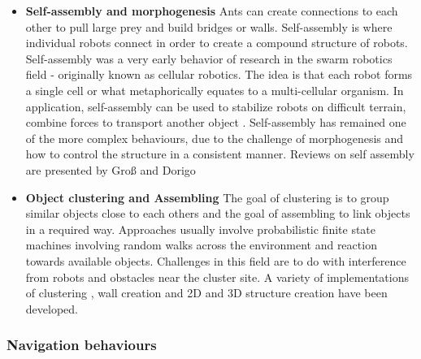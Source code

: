 \begin{itemize}
	\item \textbf{Self-assembly and morphogenesis}
	Ants can create connections to each other to pull large prey and build bridges or walls. Self-assembly is where individual robots connect in order to create a compound structure of robots. Self-assembly was a very early behavior of research in the swarm robotics field - originally known as cellular robotics. The idea is that each robot forms a single cell or what metaphorically equates to a multi-cellular organism. In application, self-assembly can be used to stabilize robots on difficult terrain, combine forces to transport another object \cite{brambilla2013swarm}. Self-assembly has remained one of the more complex behaviours, due to the challenge of morphogenesis and how to control the structure in a consistent manner.  
Reviews on self assembly are presented by Groß and Dorigo \cite{gross2008self}	
	
	\item \textbf{Object clustering and Assembling}
	The goal of clustering is to group similar objects close to each others and the goal of assembling to link objects in a required way. Approaches usually involve probabilistic finite state machines involving random walks across the environment and reaction towards available objects. Challenges in this field are to do with interference from robots and obstacles near the cluster site. A variety of implementations of clustering \cite{beckers1994local}, wall creation \cite{wawerla2002collective} and 2D and 3D structure creation \cite{werfel2006extended, werfel2011distributed} have been developed. 
\end{itemize}

\subsubsection{Navigation behaviours}


